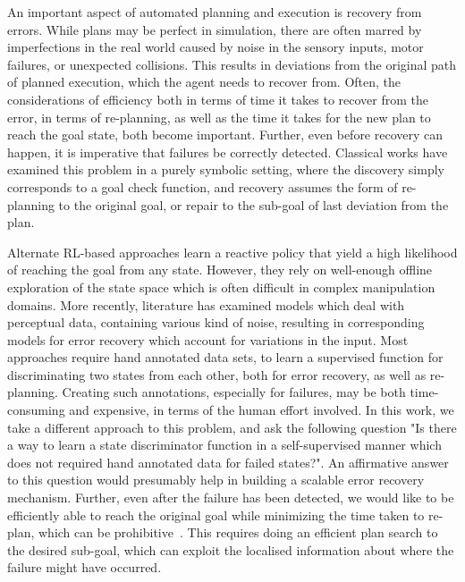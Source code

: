 \label{sec:intro}
An important aspect of automated planning and execution is recovery from errors. While plans may be perfect in simulation, there are often marred by imperfections in the real world caused by noise in the sensory inputs, motor failures, or unexpected collisions. This results in deviations from the original path of planned execution, which the agent needs to recover from. Often, the considerations of efficiency both in terms of time it takes to recover from the error, in terms of re-planning, as well as the time it takes for the new plan to reach the goal state, both become important. Further, even before recovery can happen, it is imperative that failures be correctly detected. Classical works have examined this problem in a purely symbolic setting, where the discovery simply corresponds to a goal check function, and recovery assumes the form of re-planning to the original goal, or repair to the sub-goal of last deviation from the plan.  

Alternate RL-based approaches learn a reactive policy that yield a high likelihood of reaching the goal from any state. However, they rely on well-enough offline exploration of the state space which is often difficult in complex manipulation domains. More recently, literature has examined models which deal with perceptual data, containing various kind of noise, resulting in corresponding models for error recovery which account for variations in the input. Most approaches require hand annotated data sets, to learn a supervised function for discriminating two states from each other, both for error recovery, as well as re-planning.
%
Creating such annotations, especially for failures, may be both time-consuming and expensive, in terms of the human effort involved. 
%
In this work, we take a different approach to this problem, and ask the following question "Is there a way to learn a state discriminator function in a self-supervised manner which does not required hand annotated data for failed states?". An affirmative answer to this question would presumably help in building a scalable error recovery mechanism. Further, even after the failure has been detected, we would like to be efficiently able to reach the original goal while minimizing the time taken to re-plan, which can be prohibitive~\cite{fox2006plan}. This requires doing an efficient plan search to the desired sub-goal, which can exploit the localised information about where the failure might have occurred. 

